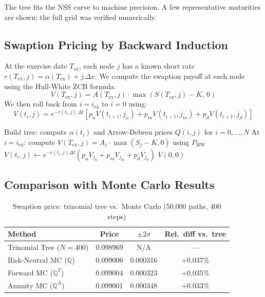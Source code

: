 \documentclass[12pt, a4paper]{article}
\newcommand{\Q}{\mathbb{Q}}
\begin{document}
The tree fits the NSS curve to machine precision. A few representative maturities are shown; the full grid was verified numerically.

\subsection{Swaption Pricing by Backward Induction}

At the exercise date $T_{\text{ex}}$, each node $j$ has a known short rate $r(T_{\text{ex}}, j) = \alpha(T_{\text{ex}}) + j\,\Delta x$. We compute the swaption payoff at each node using the Hull-White ZCB formula:
\begin{equation}
V(T_{\text{ex}}, j) = A(T_{\text{ex}}, j)\cdot\max\!\left(S(T_{\text{ex}}, j) - K,\, 0\right)
\end{equation}
We then roll back from $i = i_{\text{ex}}$ to $i = 0$ using:
\begin{equation}
V(t_i, j) = e^{-r(t_i,j)\,\Delta t}\!\left[p_u V(t_{i+1}, j_u) + p_m V(t_{i+1}, j_m) + p_d V(t_{i+1}, j_d)\right]
\end{equation}

\begin{algorithm}[H]
\caption{Trinomial Tree Pricing}
\begin{algorithmic}[1]
\State Build tree: compute $\alpha(t_i)$ and Arrow-Debreu prices $Q(i,j)$ for $i = 0,\ldots,N$
\State At $i = i_{\text{ex}}$: compute $V(T_{\text{ex}}, j) = A_j \cdot \max(S_j - K, 0)$ using $P_{\text{HW}}$
        \State $V(t_i,j) \leftarrow e^{-r(t_i,j)\Delta t}(p_u V_{j_u} + p_m V_{j_m} + p_d V_{j_d})$
    \EndFor
\EndFor
\State \Return $V(0, 0)$
\end{algorithmic}
\end{algorithm}

\subsection{Comparison with Monte Carlo Results}

\begin{table}[H]
\centering
\begin{tabular}{lccc}
\toprule
\textbf{Method} & \textbf{Price} & \textbf{$\pm 2\sigma$} & \textbf{Rel.\ diff vs.\ tree} \\
\midrule
Trinomial Tree ($N=400$) & 0.098969 & N/A      & --- \\
Risk-Neutral MC ($\Q$)   & 0.099006 & 0.000316 & $+0.037\%$ \\
Forward MC ($\Q^T$)      & 0.099004 & 0.000323 & $+0.035\%$ \\
Annuity MC ($\Q^A$)      & 0.099001 & 0.000348 & $+0.033\%$ \\
\bottomrule
\end{tabular}
\caption{Swaption price: trinomial tree vs.\ Monte Carlo (50,000 paths, 400 steps)}
\end{table}
\end{document}
